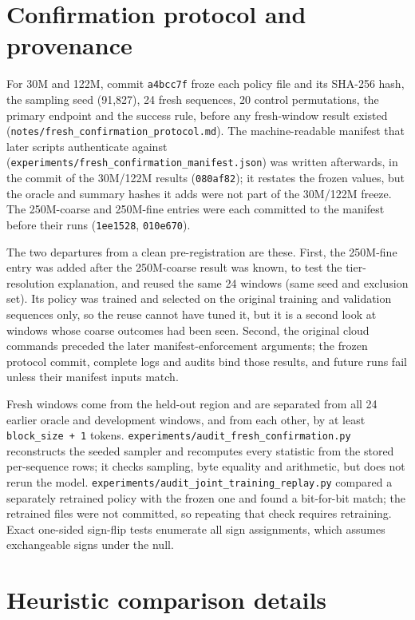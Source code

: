\documentclass[10pt]{article}
\begin{document}
\section{Confirmation protocol and provenance}

For 30M and 122M, commit \texttt{a4bcc7f} froze each policy file and its SHA-256 hash, the sampling seed (91,827), 24 fresh sequences, 20 control permutations, the primary endpoint and the success rule, before any fresh-window result existed (\texttt{notes/\allowbreak fresh\_confirmation\_protocol.md}). The machine-readable manifest that later scripts authenticate against (\texttt{experiments/\allowbreak fresh\_confirmation\_manifest.json}) was written afterwards, in the commit of the 30M/122M results (\texttt{080af82}); it restates the frozen values, but the oracle and summary hashes it adds were not part of the 30M/122M freeze. The 250M-coarse and 250M-fine entries were each committed to the manifest before their runs (\texttt{1ee1528}, \texttt{010e670}).

The two departures from a clean pre-registration are these. First, the 250M-fine entry was added after the 250M-coarse result was known, to test the tier-resolution explanation, and reused the same 24 windows (same seed and exclusion set). Its policy was trained and selected on the original training and validation sequences only, so the reuse cannot have tuned it, but it is a second look at windows whose coarse outcomes had been seen. Second, the original cloud commands preceded the later manifest-enforcement arguments; the frozen protocol commit, complete logs and audits bind those results, and future runs fail unless their manifest inputs match.

Fresh windows come from the held-out region and are separated from all 24 earlier oracle and development windows, and from each other, by at least \texttt{block\_size + 1} tokens. \texttt{experiments/\allowbreak audit\_fresh\_confirmation.py} reconstructs the seeded sampler and recomputes every statistic from the stored per-sequence rows; it checks sampling, byte equality and arithmetic, but does not rerun the model. \texttt{experiments/\allowbreak audit\_joint\_training\_replay.py} compared a separately retrained policy with the frozen one and found a bit-for-bit match; the retrained files were not committed, so repeating that check requires retraining. Exact one-sided sign-flip tests enumerate all sign assignments, which assumes exchangeable signs under the null.

\section{Heuristic comparison details}
\end{document}
